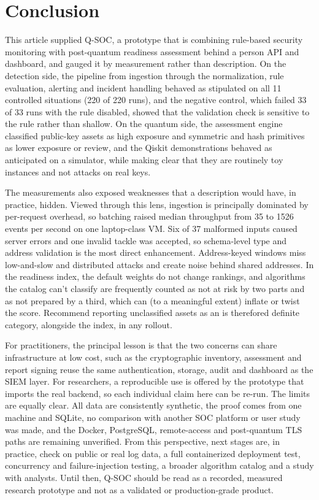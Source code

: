\documentclass[conference]{IEEEtran}
\begin{document}
\section{Conclusion}
This article supplied Q-SOC, a prototype that is combining rule-based security monitoring with post-quantum readiness assessment behind a person API and dashboard, and gauged it by measurement rather than description. On the detection side, the pipeline from ingestion through the normalization, rule evaluation, alerting and incident handling behaved as stipulated on all 11 controlled situations (220 of 220 runs), and the negative control, which failed 33 of 33 runs with the rule disabled, showed that the validation check is sensitive to the rule rather than shallow. On the quantum side, the assessment engine classified public-key assets as high exposure and symmetric and hash primitives as lower exposure or review, and the Qiskit demonstrations behaved as anticipated on a simulator, while making clear that they are routinely toy instances and not attacks on real keys.

The measurements also exposed weaknesses that a description would have, in practice, hidden. Viewed through this lens, ingestion is principally dominated by per-request overhead, so batching raised median throughput from 35 to 1526 events per second on one laptop-class VM. Six of 37 malformed inputs caused server errors and one invalid tackle was accepted, so schema-level type and address validation is the most direct enhancement. Address-keyed windows miss low-and-slow and distributed attacks and create noise behind shared addresses. In the readiness index, the default weights do not change rankings, and algorithms the catalog can't classify are frequently counted as not at risk by two parts and as not prepared by a third, which can (to a meaningful extent) inflate or twist the score. Recommend reporting unclassified assets as an is therefored definite category, alongside the index, in any rollout.

For practitioners, the principal lesson is that the two concerns can share infrastructure at low cost, such as the cryptographic inventory, assessment and report signing reuse the same authentication, storage, audit and dashboard as the SIEM layer. For researchers, a reproducible use is offered by the prototype that imports the real backend, so each individual claim here can be re-run. The limits are equally clear. All data are consistently synthetic, the proof comes from one machine and SQLite, no comparison with another SOC platform or user study was made, and the Docker, PostgreSQL, remote-access and post-quantum TLS paths are remaining unverified. From this perspective, next stages are, in practice, check on public or real log data, a full containerized deployment test, concurrency and failure-injection testing, a broader algorithm catalog and a study with analysts. Until then, Q-SOC should be read as a recorded, measured research prototype and not as a validated or production-grade product.
\end{document}
